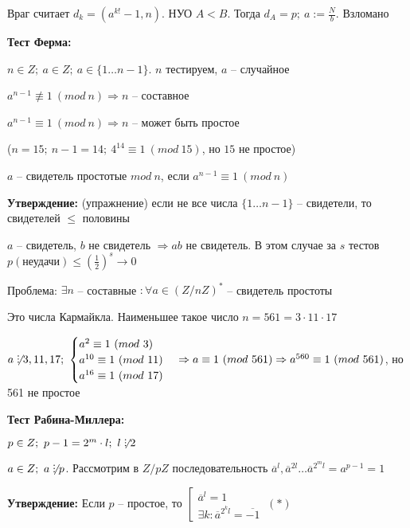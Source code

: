 \documentclass[14pt, letter paper]{article}
\DeclareRobustCommand{\divby}{%
  \mathrel{\text{\vbox{\baselineskip.65ex\lineskiplimit0pt\hbox{.}\hbox{.}\hbox{.}}}}%
}
\begin{document}
\vspace{1mm}

Враг считает $d_k = (a^{k!} - 1, n)$. НУО $A < B$. Тогда $d_A = p;\ a := \frac{N}{b}$. Взломано

\vspace{5mm}

\textbf{Тест Ферма:}

$n \in Z;\ a \in Z;\ a \in \{1 \ldots n-1\}$. $n$ тестируем, $a$ -- случайное

$a^{n-1} \not\equiv 1\ (mod\ n) \Rightarrow n$ -- составное

$a^{n-1} \equiv 1\ (mod\ n) \Rightarrow n$ -- может быть простое

\vspace{2mm}

($n = 15;\ n-1 = 14;\ 4^{14} \equiv 1\ (mod\ 15)$, но $15$ не простое)

\vspace{2mm}

$a$ -- свидетель простотые $mod\ n$, если $a^{n-1} \equiv 1\ (mod\ n)$

\textbf{Утверждение:} (упражнение) если не все числа $\{1 \ldots n-1\}$ -- свидетели, то свидетелей $\leq$ половины

$a$ -- свидетель, $b$ не свидетель $\Rightarrow ab$ не свидетель. В этом случае за $s$ тестов $p(\text{неудачи}) \leq (\frac{1}{2})^s \rightarrow 0$

Проблема: $\exists n$ -- составные $: \forall a \in (Z/nZ)^*$ -- свидетель простоты

Это числа Кармайкла. Наименьшее такое число $n = 561 = 3 \cdot 11 \cdot 17$

$a \not\divby 3, 11, 17;\ \begin{cases}
    a^2 \equiv 1\ (mod\ 3) \\
    a^{10} \equiv 1\ (mod\ 11) \\
    a^{16} \equiv 1\ (mod\ 17)
\end{cases} \Rightarrow a \equiv 1\ (mod\ 561) \Rightarrow a^{560} \equiv 1\ (mod\ 561)$, но 561 не простое

\vspace{5mm}

\textbf{Тест Рабина-Миллера:}

$p \in Z;\ p - 1 = 2^m \cdot l;\ l \not\divby 2$

$a \in Z;\ a \not\divby p$. Рассмотрим в $Z/pZ$ последовательность $\overline{a}^l, \overline{a}^{2l} \ldots \overline{a}^{2^ml} = a^{p-1} = 1$

\textbf{Утверждение:} Если $p$ -- простое, то $\left[ \begin{gathered}
    \overline{a}^l = 1 \\
    \exists k : \overline{a}^{2^kl} = \overline{-1}
\end{gathered} \right.\ (*)$
\end{document}
